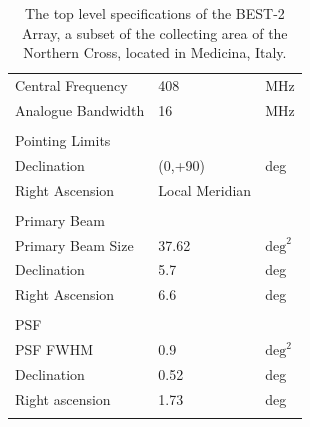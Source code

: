 \documentclass[useAMS,macros,usenatbib,onecolumn]{mn2e}
\begin{document}
\begin{table}
\begin{center}
\begin{tabular}{| l | l | l |}
\hline
Central Frequency 		&        408 &        MHz 	\\
Analogue Bandwidth 		&         16 &        MHz 	\\
				&            &            	\\
\hline
Pointing Limits 		&            &            	\\
\hline
Declination 			&    (0,+90) &        deg 	\\
Right Ascension 		&    Local Meridian &  		\\
				&            &            	\\
\hline
Primary Beam 			&            &           	\\
\hline
Primary Beam Size 		&      37.62 & $\textrm{deg}^2$ \\
Declination 			&        5.7 &        deg 	\\
Right Ascension 		&        6.6 &        deg 	\\
				&            &            	\\
\hline
PSF    				&            &       		\\
\hline
PSF FWHM 			&        0.9 & $\textrm{deg}^2$ \\
Declination 			&       0.52 &     deg 		\\
Right ascension 		&       1.73 &     deg 		\\
				&            &            	\\
\hline
\end{tabular}
\caption{The top level specifications of the BEST-2 Array, a subset of the collecting area of the Northern Cross, located in Medicina, Italy.}
\label{tbl:best2}
\end{center}
\end{table}
\end{document}
